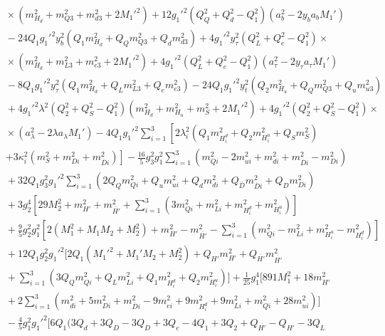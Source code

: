 \documentclass[preprint,amsmath,amssymb,aps,superscriptaddress,prd,showpacs,floatfix,nofootinbib]{revtex4-1}
\begin{document}
\begin{subequations}
\begin{align}
&{}\times\left ( m_{H_d}^2+m_{Q3}^2+m_{d3}^2+2M_1'^2\right )+12g_1'^2\left ( Q_Q^2+Q_d^2-Q_1^2\right )\left ( a_b^2-2y_ba_bM_1'\right )\nonumber\\
&{}-24Q_1g_1'^2y_b^2\left ( Q_1m_{H_d}^2+Q_Qm_{Q3}^2+Q_dm_{d3}^2\right )+4g_1'^2y_\tau^2\left ( Q_L^2+Q_e^2-Q_1^2\right )\times\nonumber\\
&{}\times\left ( m_{H_d}^2+m_{L3}^2+m_{e3}^2+2M_1'^2\right )+4g_1'^2\left ( Q_L^2+Q_e^2-Q_1^2\right )\left ( a_\tau^2-2y_\tau a_\tau M_1'\right )\nonumber\\
&{}-8Q_1g_1'^2y_\tau^2\left ( Q_1m_{H_d}^2+Q_Lm_{L3}^2+Q_em_{e3}^2\right )-24Q_1g_1'^2y_t^2\left ( Q_2m_{H_u}^2+Q_Qm_{Q3}^2+Q_um_{u3}^2\right )\nonumber\\
&{}+4g_1'^2\lambda^2\left ( Q_2^2+Q_S^2-Q_1^2\right )\left ( m_{H_d}^2+m_{H_u}^2+m_S^2+2M_1'^2\right )+4g_1'^2\left ( Q_2^2+Q_S^2-Q_1^2\right )\times\nonumber\\
&{}\times\left ( a_\lambda^2-2\lambda a_\lambda M_1'\right )-4Q_1g_1'^2\sum_{i=1}^3\left [ 2\lambda_i^2\left ( Q_1m_{H_i^d}^2+Q_2m_{H_i^u}^2+Q_Sm_S^2\right )\right.\nonumber\\
&{}\left.+3\kappa_i^2\left ( m_S^2+m_{Di}^2+m_{\overline{D}i}^2\right )\right ]-\frac{16}{5}g_3^2g_1^2\sum_{i=1}^3\left ( m_{Qi}^2-2m_{ui}^2+m_{di}^2+m_{\overline{D}i}^2-m_{Di}^2\right )\nonumber\\
&{}+32Q_1g_3^2g_1'^2\sum_{i=1}^3\left ( 2Q_Qm_{Qi}^2+Q_um_{ui}^2+Q_dm_{di}^2+Q_{\overline{D}}m_{\overline{D}i}^2+Q_Dm_{Di}^2\right )\nonumber\\
&{}+3g_2^4\left [ 29M_2^2+m_{H'}^2+m_{\overline{H'}}^2+\sum_{i=1}^3\left ( 3m_{Qi}^2+m_{Li}^2+m_{H_i^d}^2+m_{H_i^u}^2\right )\right ]\nonumber\\
&{}+\frac{9}{5}g_2^2g_1^2\left [ 2\left ( M_1^2+M_1M_2+M_2^2\right )+m_{H'}^2-m_{\overline{H'}}^2-\sum_{i=1}^3\left ( m_{Qi}^2-m_{Li}^2+m_{H_i^u}^2-m_{H_i^d}^2\right )\right ]\nonumber\\
&{}+12Q_1g_2^2g_1'^2\bigg [ 2Q_1\left ( M_1'^2+M_1'M_2+M_2^2\right )+Q_{H'}m_{H'}^2+Q_{\overline{H'}}m_{\overline{H'}}^2\nonumber\\
&{}+\sum_{i=1}^3\left ( 3Q_Qm_{Qi}^2+Q_Lm_{Li}^2+Q_1m_{H_i^d}^2+Q_2m_{H_i^u}^2\right )\bigg ]+\frac{1}{25}g_1^4\bigg [ 891M_1^2+18m_{H'}^2\nonumber\\
&{}+2\sum_{i=1}^3\left ( m_{di}^2+5m_{Di}^2+m_{\overline{D}i}^2-9m_{ei}^2+9m_{H_i^d}^2+9m_{Li}^2+m_{Qi}^2+28m_{ui}^2\right )\bigg ]\nonumber\\
&{}-\frac{4}{5}g_1^2g_1'^2\bigg [ 6Q_1\big ( 3Q_d+3Q_{\overline{D}}-3Q_D+3Q_e-4Q_1+3Q_2+Q_{\overline{H'}}-Q_{H'}-3Q_L\nonumber\\

\end{align}
\end{subequations}
\end{document}
